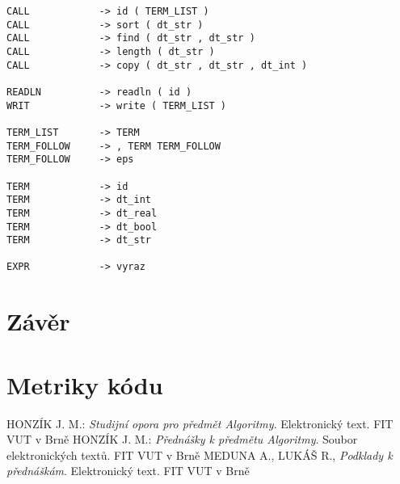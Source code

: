 \documentclass[12pt,a4paper,titlepage,final]{article}
\begin{document}
\begin{verbatim}
CALL            -> id ( TERM_LIST )
CALL            -> sort ( dt_str )
CALL            -> find ( dt_str , dt_str )
CALL            -> length ( dt_str )
CALL            -> copy ( dt_str , dt_str , dt_int )

READLN          -> readln ( id )
WRIT            -> write ( TERM_LIST )

TERM_LIST       -> TERM
TERM_FOLLOW     -> , TERM TERM_FOLLOW
TERM_FOLLOW     -> eps

TERM            -> id
TERM            -> dt_int
TERM            -> dt_real
TERM            -> dt_bool
TERM            -> dt_str

EXPR            -> vyraz
\end{verbatim}

\section{Závěr} \label{zaver}

\appendix

\section{Metriky kódu} \label{metriky}

\begin{thebibliography}{1}

HONZÍK J. M.: \emph{Studijní opora pro předmět Algoritmy}. Elektronický text. FIT VUT v Brně
HONZÍK J. M.: \emph{Přednášky k předmětu Algoritmy}. Soubor elektronických textů. FIT VUT v Brně
MEDUNA A., LUKÁŠ R., \emph{Podklady k přednáškám}. Elektronický text. FIT VUT v Brně


\end{thebibliography}
\appendix
\end{document}
